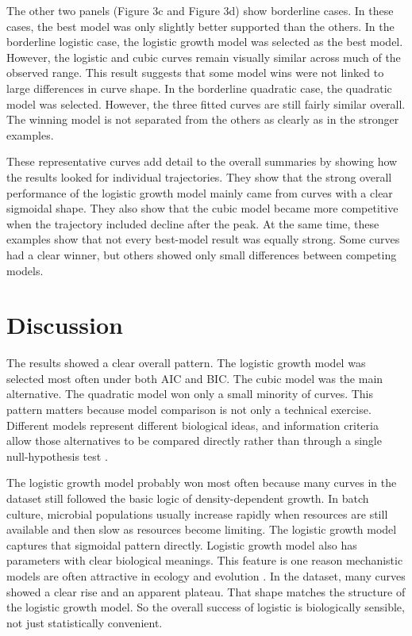 \documentclass[11pt]{article}
\begin{document}
The other two panels (Figure 3c and Figure 3d) show borderline cases. In these cases, the best model was only slightly better supported than the others. In the borderline logistic case, the logistic growth model was selected as the best model. However, the logistic and cubic curves remain visually similar across much of the observed range. This result suggests that some model wins were not linked to large differences in curve shape. In the borderline quadratic case, the quadratic model was selected. However, the three fitted curves are still fairly similar overall. The winning model is not separated from the others as clearly as in the stronger examples.

These representative curves add detail to the overall summaries by showing how the results looked for individual trajectories. They show that the strong overall performance of the logistic growth model mainly came from curves with a clear sigmoidal shape. They also show that the cubic model became more competitive when the trajectory included decline after the peak. At the same time, these examples show that not every best-model result was equally strong. Some curves had a clear winner, but others showed only small differences between competing models.


\section{Discussion}

The results showed a clear overall pattern. The logistic growth model was selected most often under both AIC and BIC. The cubic model was the main alternative. The quadratic model won only a small minority of curves. This pattern matters because model comparison is not only a technical exercise. Different models represent different biological ideas, and information criteria allow those alternatives to be compared directly rather than through a single null-hypothesis test \citep{JohnsonOmland2004}.

The logistic growth model probably won most often because many curves in the dataset still followed the basic logic of density-dependent growth. In batch culture, microbial populations usually increase rapidly when resources are still available and then slow as resources become limiting. The logistic growth model captures that sigmoidal pattern directly. Logistic growth model also has parameters with clear biological meanings. This feature is one reason mechanistic models are often attractive in ecology and evolution \citep{Zwietering1990,WhiteMarshall2019}. In the dataset, many curves showed a clear rise and an apparent plateau. That shape matches the structure of the logistic growth model. So the overall success of logistic is biologically sensible, not just statistically convenient.
\end{document}
